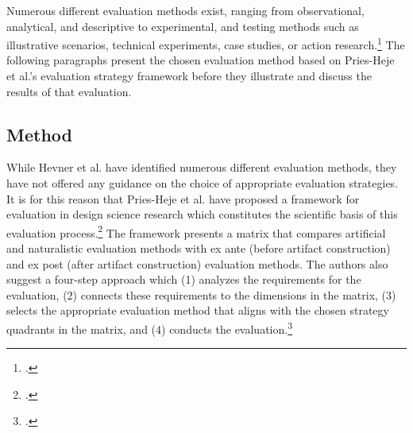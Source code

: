 
Numerous different evaluation methods exist, ranging from observational, analytical, and descriptive to experimental, and testing methods such as illustrative scenarios, technical experiments, case studies, or action research.\footcites[Cf.][p.86]{HevnerDesignScienceResearch2004}[cf.][p.4 et seq]{PfeffersDesignScienceResearch2012} %
The following paragraphs present the chosen evaluation method based on Pries-Heje et al.'s evaluation strategy framework before they illustrate and discuss the results of that evaluation. 

\subsection{Method} \label{subsec:EvaluationMethod}

While Hevner et al. have identified numerous different evaluation methods, they have not offered any guidance on the choice of appropriate evaluation strategies. It is for this reason that Pries-Heje et al. have proposed a framework for evaluation in design science research which constitutes the scientific basis of this evaluation process.\footcites[Cf.][p.11 et seq]{Pries-HejeComprehensiveFrameworkEvaluation2012} The framework presents a matrix that compares artificial and naturalistic evaluation methods with ex ante (before artifact construction) and ex post (after artifact construction) evaluation methods. The authors also suggest a four-step approach which (1) analyzes the requirements for the evaluation, (2) connects these requirements to the dimensions in the matrix, (3) selects the appropriate evaluation method that aligns with the chosen strategy quadrants in the matrix, and (4) conducts the evaluation.\footcites[Cf.][p.13]{Pries-HejeComprehensiveFrameworkEvaluation2012} 

